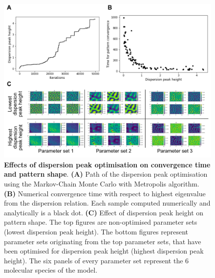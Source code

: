 \begin{figure}[H] %
    \centering
    \includegraphics[width=1\textwidth]{chapters/Chapter 1/dispersion_peak_optimisation} %
    \caption{\textbf{Effects of dispersion peak optimisation on convergence time and pattern shape}. \textbf{(A)} Path of the dispersion peak optimisation using the Markov-Chain Monte Carlo with Metropolis algorithm. \textbf{(B)} Numerical convergence time with respect to highest eigenvalue from the dispersion relation. Each sample computed numerically and analytically is a black dot. \textbf{(C)} Effect of dispersion peak height on pattern shape. The top figures are non-optimised parameter sets (lowest dispersion peak height). The bottom figures represent parameter sets originating from the top parameter sets, that have been optimised for dispersion peak height (highest dispersion peak height). The six panels of every parameter set represent the 6 molecular species of the model.}
    \label{fig:dispersion_peak_optimisation} %
\end{figure}



